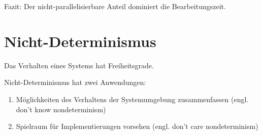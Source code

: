Fazit: Der nicht-parallelisierbare Anteil dominiert die Bearbeitungszeit.

\section{Nicht-Determinismus}
\begin{definition}
Das Verhalten eines Systems hat Freiheitsgrade.
\end{definition}

Nicht-Determinismus hat zwei Anwendungen:
\begin{enumerate}
\item Möglichkeiten des Verhaltens der Systemumgebung zusammenfassen (engl. don't know nondeterminism)
\item Spielraum für Implementierungen vorsehen (engl. don't care nondeterminism)
\end{enumerate}

